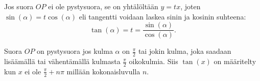 Jos suora $OP$ ei ole pystysuora, se on yhtälöltään $y = tx$, joten $\sin(\alpha) = t\cos(\alpha)$ eli tangentti voidaan laskea sinin ja kosinin suhteena:
\[\tan(\alpha) = t = \frac{\sin(\alpha)}{\cos(\alpha)}.\]

Suora $OP$ on pystysuora jos kulma $\alpha$ on $\frac{\pi}{2}$ tai jokin kulma, joka saadaan lisäämällä tai vähentämällä kulmasta $\frac{\pi}{2}$ oikokulmia. Siis $\tan(x)$ on määritelty kun $x$ ei ole $\frac{\pi}{2} + n\pi$ millään kokonaisluvulla $n$.
